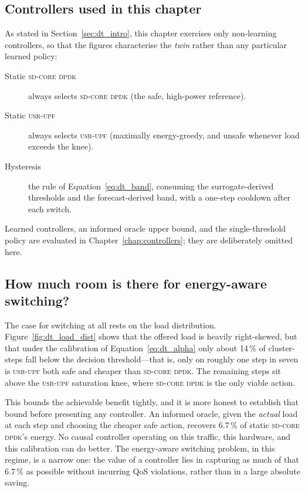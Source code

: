\documentclass[12pt, a4paper]{report}
\newcommand{\dpdk}{\textsc{sd-core dpdk}}
\newcommand{\usr}{\textsc{usr-upf}}
\begin{document}
\subsection{Controllers used in this chapter}

As stated in Section~\ref{sec:dt_intro}, this chapter exercises only
non-learning controllers, so that the figures characterise the \emph{twin}
rather than any particular learned policy:
\begin{description}
  \item[Static \dpdk{}] always selects \dpdk{} (the safe, high-power
    reference).
  \item[Static \usr{}] always selects \usr{} (maximally energy-greedy, and
    unsafe whenever load exceeds the knee).
  \item[Hysteresis] the rule of Equation~\eqref{eq:dt_band}, consuming the
    surrogate-derived thresholds and the forecast-derived band, with a
    one-step cooldown after each switch.
\end{description}
Learned controllers, an informed oracle upper bound, and the single-threshold
policy are evaluated in Chapter~\ref{chap:controllers}; they are deliberately
omitted here.

\subsection{How much room is there for energy-aware switching?}

The case for switching at all rests on the load distribution.
Figure~\ref{fig:dt_load_dist} shows that the offered load is heavily
right-skewed, but that under the calibration of
Equation~\eqref{eq:dt_alpha} only about 14\,\% of cluster-steps fall below the
decision threshold---that is, only on roughly one step in seven is \usr{} both
safe and cheaper than \dpdk{}. The remaining steps sit above the \usr{}
saturation knee, where \dpdk{} is the only viable action.

This bounds the achievable benefit tightly, and it is more honest to establish
that bound before presenting any controller. An informed oracle, given the
\emph{actual} load at each step and choosing the cheaper safe action, recovers
6.7\,\% of static \dpdk{}'s energy. No causal controller operating on this
traffic, this hardware, and this calibration can do better. The energy-aware
switching problem, in this regime, is a narrow one: the value of a controller
lies in capturing as much of that 6.7\,\% as possible without incurring QoS
violations, rather than in a large absolute saving.
\end{document}
